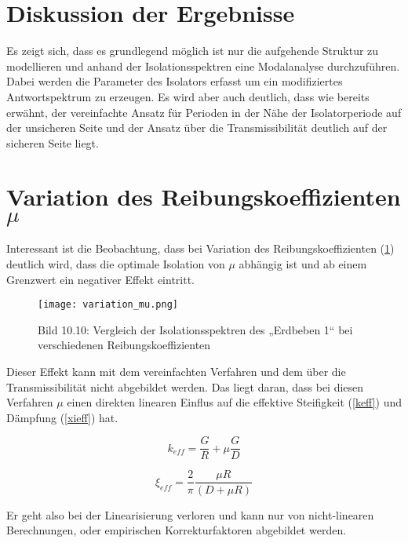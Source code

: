 \section{Diskussion der Ergebnisse}
\label{sec:diskussion}

Es zeigt sich, dass es grundlegend möglich ist nur die aufgehende Struktur zu modellieren und anhand der Isolationsspektren eine Modalanalyse durchzuführen.
Dabei werden die Parameter des Isolators erfasst um ein modifiziertes Antwortspektrum zu erzeugen.
Es wird aber auch deutlich, dass wie bereits erwähnt, der vereinfachte Ansatz für Perioden in der Nähe der Isolatorperiode auf der unsicheren Seite und der Ansatz über die Transmissibilität deutlich auf der sicheren Seite liegt.

\section{Variation des Reibungskoeffizienten $\mu$}
\label{sec:muvariation}

Interessant ist die Beobachtung, dass bei Variation des Reibungskoeffizienten (\cref{fig:muvariation}) deutlich wird, dass die optimale Isolation von $\mu$ abhängig ist und ab einem Grenzwert ein negativer Effekt eintritt.

\begin{figure}[H]
    \centering
    \texttt{[image: variation\_mu.png]}
    \caption{Bild 10.10: Vergleich der Isolationsspektren des „Erdbeben 1“ bei verschiedenen Reibungskoeffizienten \cite{Isemann}}
    \label{fig:muvariation}
\end{figure}

Dieser Effekt kann mit dem vereinfachten Verfahren und dem über die Transmissibilität nicht abgebildet werden. Das liegt daran, dass bei diesen Verfahren $\mu$ einen direkten linearen Einflus auf die effektive Steifigkeit (\cref{keff}) und Dämpfung (\cref{xieff}) hat.

\begin{equation*}
k_{eff} = \frac{G}{R} + \mu \frac{G}{D}
\end{equation*}

\begin{equation*}
\xi_{eff} = \frac{2}{\pi} \frac{\mu R}{(D + \mu R)}
\end{equation*}

Er geht also bei der Linearisierung verloren und kann nur von nicht-linearen Berechnungen, oder empirischen Korrekturfaktoren abgebildet werden.

